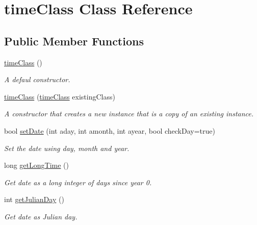 \hypertarget{classtime_class}{}\section{time\+Class Class Reference}
\label{classtime_class}
\subsection*{Public Member Functions}
\begin{DoxyCompactItemize}
\item 
\mbox{\label{classtime_class_a38ce37ac715835464b8a4109bdb6510f}} 
\mbox{\hyperlink{classtime_class_a38ce37ac715835464b8a4109bdb6510f}{time\+Class}} ()
\begin{DoxyCompactList}\small\item\em A defaul constructor. \end{DoxyCompactList}\item 
\mbox{\hyperlink{classtime_class_a2e9663011afb5016b7d5f19a0f3e620c}{time\+Class}} (\mbox{\hyperlink{classtime_class}{time\+Class}} existing\+Class)
\begin{DoxyCompactList}\small\item\em A constructor that creates a new instance that is a copy of an existing instance. \end{DoxyCompactList}\item 
bool \mbox{\hyperlink{classtime_class_a2549ae2d02d6ef32bb0afb19d5ddd45d}{set\+Date}} (int aday, int amonth, int ayear, bool check\+Day=true)
\begin{DoxyCompactList}\small\item\em Set the date using day, month and year. \end{DoxyCompactList}\item 
\mbox{\label{classtime_class_ada28c20d7a0a54db849c7dd19638f6d5}} 
long \mbox{\hyperlink{classtime_class_ada28c20d7a0a54db849c7dd19638f6d5}{get\+Long\+Time}} ()
\begin{DoxyCompactList}\small\item\em Get date as a long integer of days since year 0. \end{DoxyCompactList}\item 
int \mbox{\hyperlink{classtime_class_a56c018f6d4c6da5e8bc48cc4c7229d86}{get\+Julian\+Day}} ()
\begin{DoxyCompactList}\small\item\em Get date as Julian day. \end{DoxyCompactList}\item 

\end{DoxyCompactItemize}
